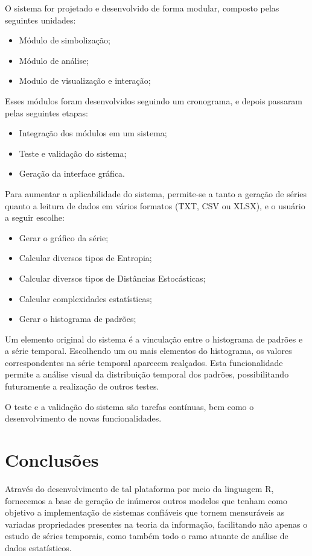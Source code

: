 \documentclass[journal,a4paper,11pt]{IEEEtran}
\begin{document}
    O sistema for projetado e desenvolvido de forma modular, composto pelas seguintes unidades:
\begin{itemize}
\item Módulo de simbolização;
\item Módulo de análise;
\item Modulo de visualização e interação;
\end{itemize} 

	Esses módulos foram desenvolvidos seguindo um cronograma, e depois passaram pelas seguintes etapas:
\begin{itemize}
\item Integração dos módulos em um sistema;
\item Teste e validação do sistema;
\item Geração da interface gráfica.
\end{itemize}

	Para aumentar a aplicabilidade do sistema, permite-se a tanto a geração de séries quanto a leitura de dados em vários formatos (TXT, CSV ou XLSX), e o usuário a seguir escolhe:
\begin{itemize}
\item Gerar o gráfico da série;
\item Calcular diversos tipos de Entropia;
\item Calcular diversos tipos de Distâncias Estocásticas;
\item Calcular complexidades estatísticas;
\item Gerar o histograma de padrões;
\end{itemize}

Um elemento original do sistema é a vinculação entre o histograma de padrões e a série temporal.
 Escolhendo um ou mais elementos do histograma, os valores correspondentes na série temporal aparecem realçados.
 Esta funcionalidade permite a análise visual da distribuição temporal dos padrões, possibilitando futuramente a realização de outros testes.
 
 O teste e a validação do sistema são tarefas contínuas, bem como o desenvolvimento de novas funcionalidades.

\section*{\textbf{Conclusões}}

	Através do desenvolvimento de tal plataforma por meio da linguagem R, fornecemos a base de geração de inúmeros outros modelos que tenham como objetivo a implementação de sistemas confiáveis que tornem mensuráveis as variadas propriedades presentes na teoria da informação, facilitando não apenas o estudo de séries temporais, como também todo o ramo atuante de análise de dados estatísticos.
\end{document}
